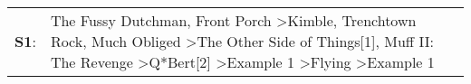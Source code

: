 \begin{supertabular}{p{0.03\textwidth}p{0.92\textwidth}}
 \textbf{S1}:  &  The Fussy Dutchman\textsuperscript{}, \enspace Front Porch\textsuperscript{} \textgreater \enspace Kimble\textsuperscript{}, \enspace Trenchtown Rock\textsuperscript{}, \enspace Much Obliged\textsuperscript{} \textgreater \enspace The Other Side of Things[1]\textsuperscript{}, \enspace Muff II: The Revenge\textsuperscript{} \textgreater \enspace Q*Bert[2]\textsuperscript{} \textgreater \enspace Example 1\textsuperscript{} \textgreater \enspace Flying\textsuperscript{} \textgreater \enspace Example 1\textsuperscript{}  \enspace  \\
\end{supertabular}
